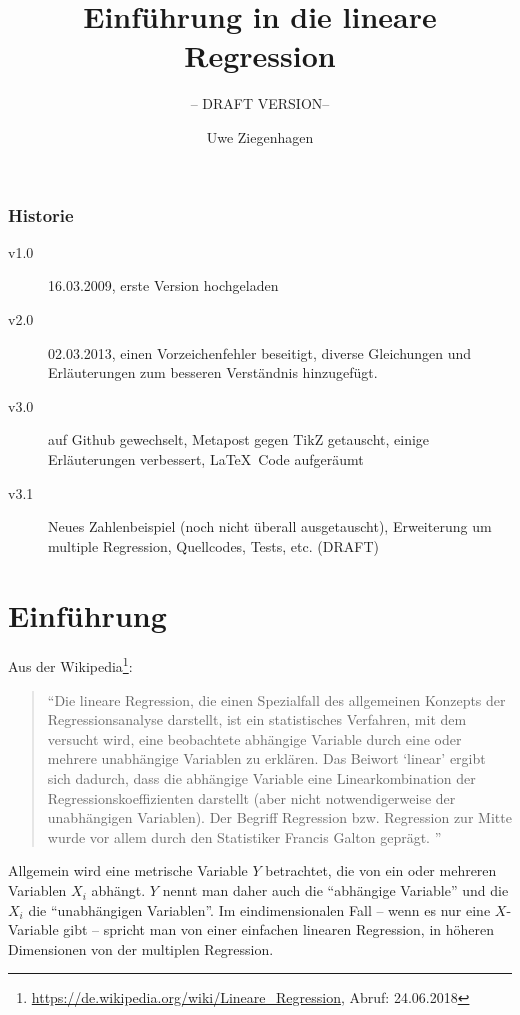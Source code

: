 \documentclass[ngerman, 12pt]{scrartcl}
\title{Einführung in die lineare Regression}
\subtitle{-- DRAFT VERSION--}
\author{Uwe Ziegenhagen}
\begin{document}
\maketitle

\subsubsection*{Historie}

\begin{description}
\item[v1.0] 16.03.2009, erste Version hochgeladen
\item[v2.0] 02.03.2013, einen Vorzeichenfehler beseitigt, diverse Gleichungen und Erläuterungen zum besseren Verständnis hinzugefügt.
\item [v3.0] auf Github gewechselt, Metapost gegen TikZ getauscht, einige Erläuterungen verbessert, \LaTeX\ Code aufgeräumt
\item [v3.1] Neues Zahlenbeispiel (noch nicht überall ausgetauscht), Erweiterung um multiple Regression, Quellcodes, Tests, etc. (DRAFT) 
\end{description}

\section{Einführung}

Aus der Wikipedia\footnote{\url{https://de.wikipedia.org/wiki/Lineare_Regression}, Abruf: 24.06.2018}: 

\begin{quote}
\enquote{Die lineare Regression, die einen Spezialfall des allgemeinen Konzepts der Regressionsanalyse darstellt, ist ein statistisches Verfahren, mit dem versucht wird, eine beobachtete abhängige Variable durch eine oder mehrere unabhängige Variablen zu erklären. Das Beiwort \enquote{linear} ergibt sich dadurch, dass die abhängige Variable eine Linearkombination der Regressionskoeffizienten darstellt (aber nicht notwendigerweise der unabhängigen Variablen). Der Begriff Regression bzw. Regression zur Mitte wurde vor allem durch den Statistiker Francis Galton geprägt. 
}\end{quote}

Allgemein wird eine metrische Variable $Y$ betrachtet, die von ein oder mehreren Variablen $X_i$ abhängt. $Y$ nennt man daher auch die \enquote{abhängige Variable} und die $X_i$ die \enquote{unabhängigen Variablen}.  Im eindimensionalen Fall -- wenn es nur eine $X$-Variable gibt -- spricht man von einer einfachen linearen Regression, in höheren Dimensionen von der multiplen Regression.
\end{document}
